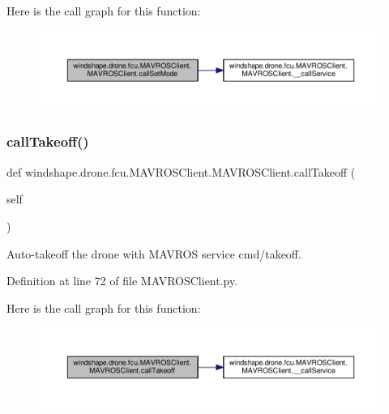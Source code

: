 Here is the call graph for this function\+:\nopagebreak
\begin{figure}[H]
\begin{center}
\leavevmode
\includegraphics[width=350pt]{classwindshape_1_1drone_1_1fcu_1_1_m_a_v_r_o_s_client_1_1_m_a_v_r_o_s_client_a45ddb81a76860f822dbfc21e2bacd82f_cgraph}
\end{center}
\end{figure}
\mbox{\label{classwindshape_1_1drone_1_1fcu_1_1_m_a_v_r_o_s_client_1_1_m_a_v_r_o_s_client_a671bf2248dd98c3ecef4f6fd8348b099}} 
\subsubsection{\texorpdfstring{call\+Takeoff()}{callTakeoff()}}
{\footnotesize\ttfamily def windshape.\+drone.\+fcu.\+M\+A\+V\+R\+O\+S\+Client.\+M\+A\+V\+R\+O\+S\+Client.\+call\+Takeoff (\begin{DoxyParamCaption}\item[{}]{self }\end{DoxyParamCaption})}

\begin{DoxyVerb}Auto-takeoff the drone with MAVROS service cmd/takeoff.\end{DoxyVerb}
 

Definition at line 72 of file M\+A\+V\+R\+O\+S\+Client.\+py.

Here is the call graph for this function\+:\nopagebreak
\begin{figure}[H]
\begin{center}
\leavevmode
\includegraphics[width=350pt]{classwindshape_1_1drone_1_1fcu_1_1_m_a_v_r_o_s_client_1_1_m_a_v_r_o_s_client_a671bf2248dd98c3ecef4f6fd8348b099_cgraph}
\end{center}
\end{figure}


